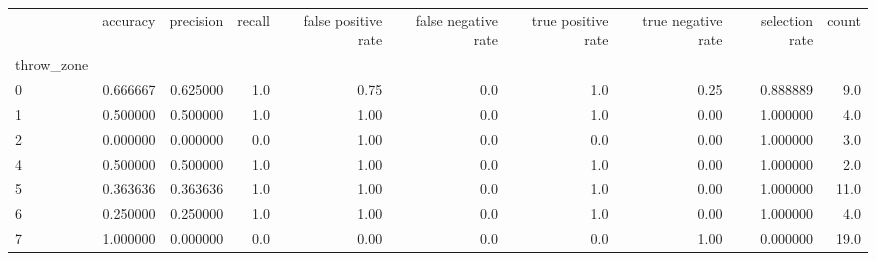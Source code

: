 \begin{tabular}{lrrrrrrrrr}
\toprule
{} &  accuracy &  precision &  recall &  false positive rate &  false negative rate &  true positive rate &  true negative rate &  selection rate &  count \\
throw\_zone &           &            &         &                      &                      &                     &                     &                 &        \\
\midrule
0          &  0.666667 &   0.625000 &     1.0 &                 0.75 &                  0.0 &                 1.0 &                0.25 &        0.888889 &    9.0 \\
1          &  0.500000 &   0.500000 &     1.0 &                 1.00 &                  0.0 &                 1.0 &                0.00 &        1.000000 &    4.0 \\
2          &  0.000000 &   0.000000 &     0.0 &                 1.00 &                  0.0 &                 0.0 &                0.00 &        1.000000 &    3.0 \\
4          &  0.500000 &   0.500000 &     1.0 &                 1.00 &                  0.0 &                 1.0 &                0.00 &        1.000000 &    2.0 \\
5          &  0.363636 &   0.363636 &     1.0 &                 1.00 &                  0.0 &                 1.0 &                0.00 &        1.000000 &   11.0 \\
6          &  0.250000 &   0.250000 &     1.0 &                 1.00 &                  0.0 &                 1.0 &                0.00 &        1.000000 &    4.0 \\
7          &  1.000000 &   0.000000 &     0.0 &                 0.00 &                  0.0 &                 0.0 &                1.00 &        0.000000 &   19.0 \\
\bottomrule
\end{tabular}
